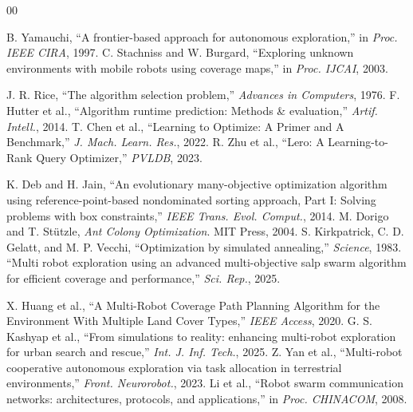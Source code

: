\documentclass[conference]{IEEEtran}
\begin{document}
\FloatBarrier


\begin{thebibliography}{00}

 B. Yamauchi, ``A frontier-based approach for autonomous exploration,'' in \textit{Proc. IEEE CIRA}, 1997.
 C. Stachniss and W. Burgard, ``Exploring unknown environments with mobile robots using coverage maps,'' in \textit{Proc. IJCAI}, 2003.

 J. R. Rice, ``The algorithm selection problem,'' \textit{Advances in Computers}, 1976.
 F. Hutter et al., ``Algorithm runtime prediction: Methods \& evaluation,'' \textit{Artif. Intell.}, 2014.
 T. Chen et al., ``Learning to Optimize: A Primer and A Benchmark,'' \textit{J. Mach. Learn. Res.}, 2022.
 R. Zhu et al., ``Lero: A Learning-to-Rank Query Optimizer,'' \textit{PVLDB}, 2023.

 K. Deb and H. Jain, ``An evolutionary many-objective optimization algorithm using reference-point-based nondominated sorting approach, Part I: Solving problems with box constraints,'' \textit{IEEE Trans. Evol. Comput.}, 2014.
 M. Dorigo and T. St\"utzle, \textit{Ant Colony Optimization}. MIT Press, 2004.
 S. Kirkpatrick, C. D. Gelatt, and M. P. Vecchi, ``Optimization by simulated annealing,'' \textit{Science}, 1983.
 ``Multi robot exploration using an advanced multi-objective salp swarm algorithm for efficient coverage and performance,'' \textit{Sci. Rep.}, 2025.

 X. Huang et al., ``A Multi-Robot Coverage Path Planning Algorithm for the Environment With Multiple Land Cover Types,'' \textit{IEEE Access}, 2020.
 G. S. Kashyap et al., ``From simulations to reality: enhancing multi-robot exploration for urban search and rescue,'' \textit{Int. J. Inf. Tech.}, 2025.
 Z. Yan et al., ``Multi-robot cooperative autonomous exploration via task allocation in terrestrial environments,'' \textit{Front. Neurorobot.}, 2023.
 Li et al., ``Robot swarm communication networks: architectures, protocols, and applications,'' in \textit{Proc. CHINACOM}, 2008.

\end{thebibliography}
\end{document}
